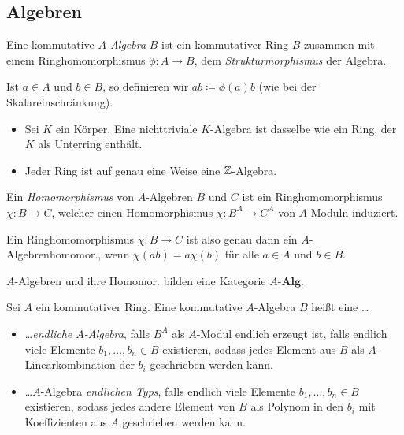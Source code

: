 \documentclass{cheat-sheet}
\newcommand{\Alg}{\mathbf{Alg}} %
\newcommand{\AAlg}[1]{{#1}\text{-}\Alg} %
\begin{document}
\subsection{Algebren}


\begin{defn}
  Eine kommutative \emph{$A$-Algebra} $B$ ist ein kommutativer Ring $B$ zusammen mit einem Ringhomomorphismus $\phi : A \to B$, dem \textit{Strukturmorphismus} der Algebra.
\end{defn}

\begin{bem}
  Ist $a \in A$ und $b \in B$, so definieren wir $a b \coloneqq \phi(a) b$ (wie bei der Skalareinschränkung).
\end{bem}

\begin{bspe}
  \begin{itemize}
    \item Sei $K$ ein Körper.
    Eine nichttriviale $K$-Algebra ist dasselbe wie ein Ring, der $K$ als Unterring enthält.
    \item Jeder Ring ist auf genau eine Weise eine $\mathbb{Z}$-Algebra.
  \end{itemize}
\end{bspe}

\begin{defn}
  Ein \textit{Homomorphismus} von $A$-Algebren $B$ und $C$ ist ein Ringhomomorphismus $\chi : B \to C$, welcher einen Homomorphismus $\chi : B^A \to C^A$ von $A$-Moduln induziert.
\end{defn}

\begin{bem}
  Ein Ringhomomorphismus $\chi : B \to C$ ist also genau dann ein $A$-Algebrenhomomor., wenn $\chi(ab) = a \chi(b)$ für alle $a \in A$ und $b \in B$.
\end{bem}

\begin{bem}
  $A$-Algebren und ihre Homomor. bilden eine Kategorie $\AAlg{A}$.
\end{bem}


\begin{defn}
  Sei $A$ ein kommutativer Ring.
  Eine kommutative $A$-Algebra $B$ heißt eine \ldots
  \begin{itemize}
    \item \ldots \emph{endliche $A$-Algebra}, falls $B^A$ als $A$-Modul endlich erzeugt ist, \dh{} falls endlich viele Elemente $b_1, \ldots, b_n \in B$ existieren, sodass jedes Element aus $B$ als $A$-Linearkombination der $b_i$ geschrieben werden kann.
    \item \ldots $A$-Algebra \emph{endlichen Typs}, falls endlich viele Elemente $b_1, \ldots, b_n \in B$ existieren, sodass jedes andere Element von $B$ als Polynom in den $b_i$ mit Koeffizienten aus $A$ geschrieben werden kann.
  \end{itemize}
\end{defn}
\end{document}
